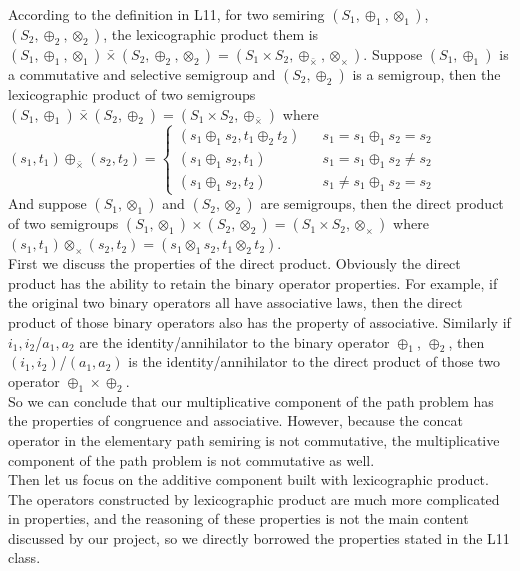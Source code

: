 \documentclass[a4paper,10pt]{article}
\begin{document}
According to the definition in L11, for two semiring $(S_1,\oplus_1,\otimes_1)$,$(S_2,\oplus_2,\otimes_2)$, the lexicographic product them is $(S_1,\oplus_1,\otimes_1) \bar{\times} (S_2,\oplus_2,\otimes_2) = (S_1\times S_2, \oplus_{\bar{\times}}, \otimes_\times)$.
Suppose $(S_1,\oplus_1)$ is a commutative and selective semigroup and $(S_2,\oplus_2)$ is a semigroup, then the lexicographic product of two semigroups $(S_1,\oplus_1) \bar{\times} (S_2,\oplus_2) = (S_1\times S_2, \oplus_{\bar{\times}})$ where\\
$(s_1,t_1) \oplus_{\bar{\times}} (s_2,t_2)=\left\{
\begin{array}{rcl}
(s_1\oplus_1 s_2,t_1\oplus_2 t_2)      &      & { s_1 = s_1 \oplus_1 s_2 = s_2}\\
(s_1\oplus_1 s_2,t_1)       &      & {s_1 = s_1 \oplus_1 s_2 \neq s_2}\\
(s_1\oplus_1 s_2,t_2)       &      & {s_1 \neq s_1 \oplus_1 s_2 = s_2}
\end{array} \right.$\\
And suppose $(S_1,\otimes_1)$ and $(S_2,\otimes_2)$ are semigroups, then the direct product of two semigroups $(S_1,\otimes_1) \times (S_2,\otimes_2) = (S_1\times S_2, \otimes_\times)$ where\\
$(s_1,t_1) \otimes_\times (s_2,t_2)= (s_1 \otimes_1 s_2, t_1\otimes_2 t_2)$.\\
First we discuss the properties of the direct product. Obviously the direct product has the ability to retain the binary operator properties. For example, if the original two binary operators all have associative laws, then the direct product of those binary operators also has the property of associative. Similarly if $i_1,i_2$/$a_1,a_2$ are the identity/annihilator to the binary operator $\oplus_1$, $\oplus_2$, then $(i_1,i_2)$/$(a_1,a_2)$ is the identity/annihilator to the direct product of those two operator $\oplus_1 \times \oplus_2$.\\
So we can conclude that our multiplicative component of the path problem has the properties of congruence and associative. However, because the concat operator in the elementary path semiring is not commutative, the multiplicative component of the path problem is not commutative as well.\\
Then let us focus on the additive component built with lexicographic product. 
The operators constructed by lexicographic product are much more complicated in properties, and the reasoning of these properties is not the main content discussed by our project, so we directly borrowed the properties stated in the L11 class.\\
\end{document}
